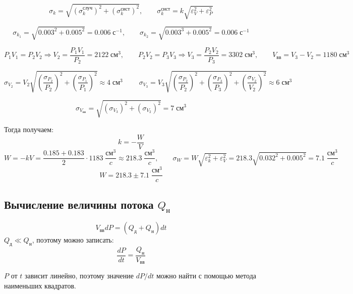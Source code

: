 \documentclass{article}
\newcommand{\x}{\text}
\begin{document}
$$\sigma_k = \sqrt{(\sigma_k^\x{случ})^2+(\sigma_k^\x{сист})^2}, \qquad \sigma_k^\x{сист} = k\sqrt{\varepsilon_V^2 + \varepsilon_P^2}$$

$$\sigma_{k_1} = \sqrt{0.003^2 + 0.005^2} = 0.006 \; \x{с}^{-1}, \qquad \sigma_{k_2} = \sqrt{0.003^3 + 0.005^2} = 0.006 \; \x{с}^{-1}$$

$$P_1 V_1 = P_2 V_2 \Rightarrow V_2 = \frac{P_1 V_1}{P_2} =  2122 \; \x{см}^{3}, \qquad P_2 V_2 = P_3 V_3 \Rightarrow V_3 = \frac{P_2 V_2}{P_3} = 3302  \; \x{см}^{3}, \qquad V_\x{вв} = V_3 - V_2 = 1180  \; \x{см}^{3}$$

$$\sigma_{V_2} = V_2 \sqrt{\left(\frac{\sigma_{P_2}}{P_2}\right)^2 + \left(\frac{\sigma_{P_1}}{P_1}\right)^2} \approx 4 \; \x{см}^3\; \qquad \sigma_{V_3} = V_3 \sqrt{\left(\frac{\sigma_{P_2}}{P_2}\right)^2 + \left(\frac{\sigma_{P_3}}{P_3}\right)^2 + \left(\frac{\sigma_{V_2}}{V_2}\right)^2} \approx 6 \; \x{см}^3$$

$$\sigma_{V_\x{вв}} = \sqrt{(\sigma_{V_3})^2 + (\sigma_{V_2})^2} = 7 \; \x{см}^3$$



Тогда получаем:
$$ k  = -\frac{W}{V}$$
$$ W = - kV = \frac{0.185 + 0.183}{2} \cdot 1183 \; \frac{\x{см}^3}{c} \approx 218.3 \; \frac{\x{см}^3}{c}, \qquad \sigma_W = W\sqrt{\varepsilon_k^2 + \varepsilon_V^2} = 218.3\sqrt{0.032^2 + 0.005^2} = 7.1 \; \frac{\x{см}^3}{c}$$
$$\boxed{W = 218.3\pm7.1 \; \frac{\x{см}^3}{c}} $$
\subsection*{Вычисление величины потока $Q_\x{н}$}

$$ V_\x{вв} dP = (Q_\x{д} + Q_\x{н})dt $$
$Q_\x{д} \ll Q_\x{н}$, поэтому можно записать:
$$\frac{dP}{dt} = \frac{Q_\x{н}}{V_\x{вв}}$$

$P$ от $t$ зависит линейно, поэтому значение ${dP}/{dt}$ можно найти с помощью метода наименьших квадратов.
\end{document}
